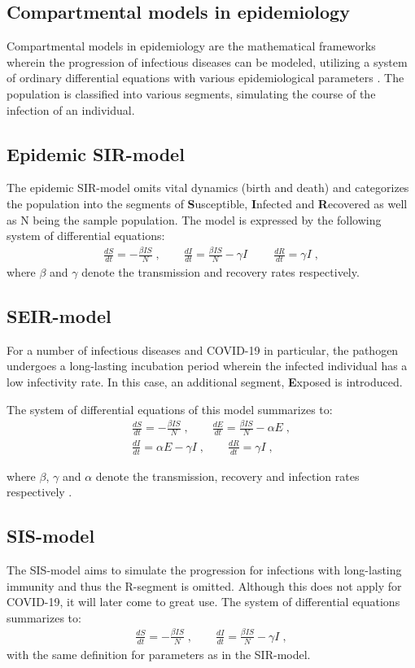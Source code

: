\documentclass[12pt]{article}
\begin{document}
\subsection{Compartmental models in epidemiology}
Compartmental models in epidemiology are the mathematical frameworks wherein the progression of infectious diseases can be modeled, utilizing a system of ordinary differential equations with various epidemiological parameters \cite{söder}. The population is classified into various segments, simulating the course of the infection of an individual.
\subsection{Epidemic SIR-model}
The epidemic SIR-model omits vital dynamics (birth and death) and categorizes the population into the segments of \textbf{S}usceptible, \textbf{I}nfected and \textbf{R}ecovered
as well as N being the sample population. The model is expressed by the following system of differential equations:
\begin{align}
\frac{dS}{dt} = - \frac{\beta I S}{N} \;, \qquad
\frac{dI}{dt} = \frac{\beta I S}{N}- \gamma I \; \qquad
\frac{dR}{dt} = \gamma I \;,
\end{align}
\noindent where $\beta$ and $\gamma$ denote the transmission and recovery rates respectively.
\subsection{SEIR-model}
For a number of infectious diseases and COVID-19 in particular, the pathogen undergoes a long-lasting incubation period wherein the infected individual has a low infectivity rate. In this case, an additional segment, \textbf{E}xposed is introduced.

\newpage 
\noindent 
The system of differential equations of this model summarizes to:
\begin{gather}
\frac{dS}{dt} = - \frac{\beta I S}{N} \;, \qquad
\frac{dE}{dt} = \frac{\beta I S}{N}- \alpha E \;, \\
\frac{dI}{dt} = \alpha E - \gamma I \;, \qquad 
\frac{dR}{dt} = \gamma I \;,
\end{gather}

\noindent where $\beta$, $\gamma$ and $\alpha$ denote the transmission,  recovery and infection rates respectively \cite{gill}.

\subsection{SIS-model}
The SIS-model aims to simulate the progression for infections with long-lasting immunity and thus the R-segment is omitted. Although this does not apply for COVID-19, it will later come to great use. The system of differential equations summarizes to:
\begin{align}
\frac{dS}{dt} = - \frac{\beta I S}{N} \;, \qquad
\frac{dI}{dt} = \frac{\beta I S}{N}- \gamma I \;, 
\end{align}
with the same definition for parameters as in the SIR-model.
\end{document}
